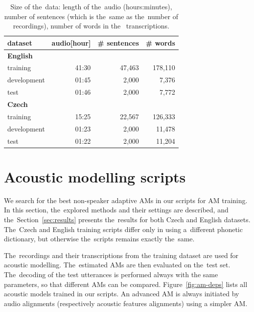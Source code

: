\begin{table}[hbp]
    \centering
    \begin{tabular}{lrrr}
        \hline
        dataset & audio[hour] & \# sentences & \# words \\
        \hline
        \textbf{English} & & & \\
                training & 41:30 & 47,463 & 178,110 \\
                development & 01:45 & 2,000 & 7,376 \\
                test & 01:46 & 2,000 & 7,772 \\
        \hline
        \textbf{Czech} & & & \\
                training & 15:25 & 22,567 & 126,333 \\
                development & 01:23 & 2,000 & 11,478 \\
                test & 01:22 & 2,000 & 11,204 \\
        \hline
		\end{tabular}
    \caption{Size of the~data: length of the~audio (hours:minutes), number of sentences
        (which is the~same as the~number of recordings), number of words in the~
    transcriptions.\cite{korvas_2014}}
    \label{tab:audio}
\end{table}


\section{Acoustic modelling scripts}
\label{sec:am_train}

We search for the best non-speaker adaptive \acp{AM} in our scripts for \ac{AM} training. 
In this section, the~explored methods and their settings are described, and the~Section~\ref{sec:results} presents the~results for both Czech and English datasets.
The~Czech and English training scripts differ only in using a~different phonetic dictionary, but otherwise the~scripts remains exactly the~same.

The~recordings and their transcriptions from the training dataset are used for acoustic modelling.
The~estimated \acp{AM} are then evaluated on the~test set.
The~decoding of the test utterances is performed always with the same parameters, so that different \acp{AM} can be compared.
Figure~\ref{fig:am-deps} lists all acoustic models trained in our scripts.
An advanced \ac{AM} is always initiated by audio alignments (respectively acoustic features alignments) using a simpler \ac{AM}.

